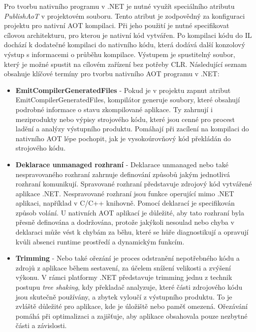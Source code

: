 
Pro tvorbu nativního programu v .NET je nutné využít speciálního atributu \emph{PublishAoT} v projektovém souboru. Tento atribut je zodpovědný za konfiguraci projektu pro nativní AOT kompilaci. Při jeho použití je nutné specifikovat cílovou architekturu, pro kterou je nativní kód vytvářen. Po kompilaci kódu do IL dochází k dodatečné kompilaci do nativního kódu, která dodává další konzolový výstup s informacemi o průběhu kompilace. Výstupem je spustitelný soubor, který je možné spustit na cílovém zařízení bez potřeby CLR. Následující seznam obsahuje klíčové termíny pro tvorbu nativního AOT programu v .NET:

\begin{itemize}
    \item \textbf{EmitCompilerGeneratedFiles} - Pokud je v projektu zapnut atribut EmitCompilerGeneratedFiles, kompilátor generuje soubory, které obsahují podrobné informace o stavu zkompilované aplikace. Ty zahrnují i meziprodukty nebo výpisy strojového kódu, které jsou cenné pro procest ladění a analýzy výstupního produktu. Pomáhají při zacílení na kompilaci do nativního AOT lépe pochopit, jak je vysokoúrovňový kód překládán do strojového kódu.
    \item \textbf{Deklarace unmanaged rozhraní} - Deklarace unmanaged nebo také nespravovaného rozhraní zahrnuje definování způsobů jakým jednotlivá rozhraní komunikují. Spravované rozhraní představuje zdrojový kód vytvářené aplikace .NET. Nespravované rozhraní jsou funkce operující mimo .NET aplikaci, například v C/C++ knihovně. Pomocí deklarací je specifikován způsob volání. U nativních AOT aplikací je důležité, aby tato rozhraní byla přesně definována a dodržována, protože jakýkoli nesoulad nebo chyba v deklaraci může vést k chybám za běhu, které se hůře diagnostikují a opravují kvůli absenci runtime prostředí a dynamickým funkcím.
    \item \textbf{Trimming} - Nebo také ořezání je proces odstranění nepotřebného kódu a zdrojů z aplikace během sestavení, za účelem snížení velikosti a zvýšení výkonu. V rámci platformy .NET představuje trimming jednu z technik postupu \emph{tree shaking}, kdy překladač analyzuje, které části zdrojového kódu jsou skutečně používány, a zbytek vyloučí z výstupního produktu. To je zvláště důležité pro aplikace, kde je úložiště nebo paměť omezená. Ořezávání pomáhá při optimalizaci a zajišťuje, aby aplikace obsahovala pouze nezbytné části a závislosti. \cite{netdocs}
\end{itemize}


